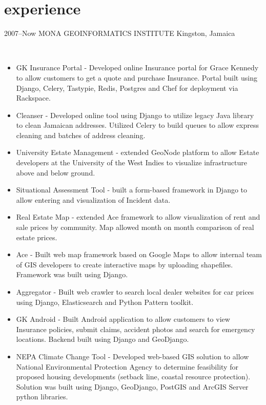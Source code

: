 \documentclass[]{cv-style}          %
\begin{document}
\section{experience}

\begin{entrylist}
\entry
  {2007--Now}
  {MONA GEOINFORMATICS INSTITUTE}
  {Kingston, Jamaica}
  {\\  
\begin{itemize}
\item GK Insurance Portal - Developed online Insurance portal for Grace Kennedy to allow customers to get a quote and purchase Insurance. Portal built using Django, Celery, Tastypie, Redis, Postgres and Chef for deployment via Rackspace.
\item Cleanser - Developed online tool using Django to utilize legacy Java library to clean Jamaican addresses. Utilized Celery to build queues to allow express cleaning and batches of address cleaning.
\item University Estate Management - extended GeoNode platform to allow Estate developers at the University of the West Indies to visualize infrastructure above and below ground.  
\item Situational Assessment Tool - built a form-based framework in Django to allow entering and visualization of Incident data. 
\item Real Estate Map - extended Ace framework to allow visualization of rent and sale prices by community. Map allowed month on month comparison of real estate prices. 
\item Ace - Built web map framework based on Google Maps to allow internal team of GIS developers to create interactive maps by uploading shapefiles. Framework was built using Django.
\item Aggregator - Built web crawler to search local dealer websites for car prices using Django, Elasticsearch and Python Pattern toolkit. 
\item GK Android - Built Android application to allow customers to view Insurance policies, submit claims, accident photos and search for emergency locations. Backend built using Django and GeoDjango.
\item NEPA Climate Change Tool - Developed web-based GIS solution to allow National Environmental Protection Agency to determine feasibility for proposed housing developments (setback line, coastal resource protection). Solution was built using Django, GeoDjango, PostGIS and ArcGIS Server python libraries.

\end{itemize}}
\end{entrylist}
\end{document}

